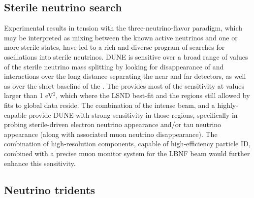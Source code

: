 \subsection{Sterile neutrino search}
\label{ssec:exsum-nd-BSMappendix-sterileneutrinos}

Experimental results in tension with the three-neutrino-flavor paradigm, which may be interpreted as mixing between the known active neutrinos and one or more sterile states, have led to a rich and diverse program of searches for oscillations into sterile neutrinos.  DUNE is sensitive over a broad range of values of the sterile neutrino mass splitting by looking for disappearance of  and  interactions over the long distance separating the near and far detectors, as well as over the short baseline of the . The  provides most of the sensitivity at values larger than 1 eV$^{2}$, which where the LSND best-fit and the regions still allowed by fits to global data reside. The combination of the intense  beam, and a highly-capable  provide DUNE with strong sensitivity in those regions, specifically in probing sterile-driven electron neutrino appearance and/or tau neutrino appearance (along with associated muon neutrino disappearance). The combination of high-resolution  components, capable of high-efficiency particle ID, combined with a precise muon monitor system for the LBNF beam would further enhance this sensitivity. 

\subsection{Neutrino tridents}
\label{ssec:exsum-nd-BSMappendix-tridents}

